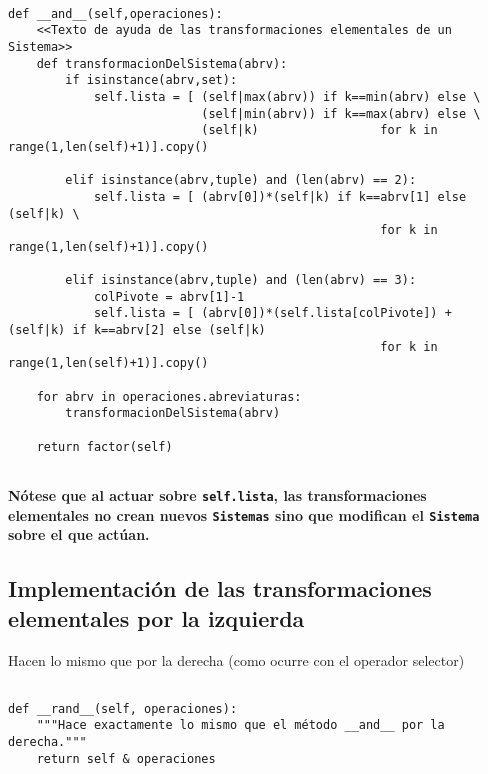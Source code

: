 \documentclass[11pt]{report}
\begin{document}
\begin{verbatim}

def __and__(self,operaciones):
    <<Texto de ayuda de las transformaciones elementales de un Sistema>>
    def transformacionDelSistema(abrv):
        if isinstance(abrv,set):
            self.lista = [ (self|max(abrv)) if k==min(abrv) else \
                           (self|min(abrv)) if k==max(abrv) else \
                           (self|k)                 for k in range(1,len(self)+1)].copy()
            
        elif isinstance(abrv,tuple) and (len(abrv) == 2):
            self.lista = [ (abrv[0])*(self|k) if k==abrv[1] else (self|k) \
                                                    for k in range(1,len(self)+1)].copy()

        elif isinstance(abrv,tuple) and (len(abrv) == 3):
            colPivote = abrv[1]-1
            self.lista = [ (abrv[0])*(self.lista[colPivote]) + (self|k) if k==abrv[2] else (self|k)
                                                    for k in range(1,len(self)+1)].copy()

    for abrv in operaciones.abreviaturas:
        transformacionDelSistema(abrv)

    return factor(self)
        
\end{verbatim}

\textbf{Nótese que al actuar sobre \texttt{self.lista}, las transformaciones elementales no crean nuevos 
\texttt{Sistemas} sino que modifican el \texttt{Sistema} sobre el que actúan.}

\subsection{Implementación de las transformaciones elementales por la izquierda}
\label{sec:orgc5fee02}

Hacen lo mismo que por la derecha (como ocurre con el operador selector)

\begin{verbatim}
        
def __rand__(self, operaciones):
    """Hace exactamente lo mismo que el método __and__ por la derecha."""
    return self & operaciones
    
\end{verbatim}
\end{document}
